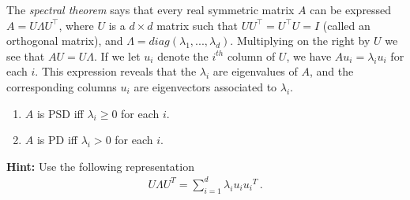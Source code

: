 \begin{enumerate}
    The \textit{spectral theorem} says that every real symmetric matrix $A$ can be expressed $A = U \Lambda U^{\top}$, where $U$ is a $d \times d$ matrix such that $UU^{\top} = U^{\top}U = I$ (called an orthogonal matrix), and $\Lambda = diag(\lambda_1,...,\lambda_d)$. Multiplying on the right by $U$ we see that $AU = U\Lambda$. If we let $u_i$ denote the $i^{th}$ column of $U$, we have $A u_i = \lambda_i u_i$ for each $i$. This expression reveals that the $\lambda_i$ are eigenvalues of $A$, and the corresponding columns $u_i$ are eigenvectors associated to $\lambda_i$.
    \begin{enumerate}
        \item  $A$ is PSD iff $\lambda_i \geq 0$ for each $i$.
        \item $A$ is PD iff $\lambda_i > 0$ for each $i$.
    \end{enumerate}
    \textbf{Hint:} Use the following representation
    \begin{align*}
    U \Lambda U^T = \sum_{i=1}^d \lambda_i { u_i u_i}^T\,.
    \end{align*}
    \solution{

}
\end{enumerate}
